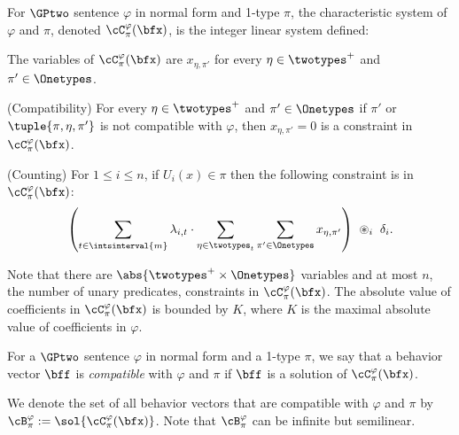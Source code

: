 \begin{definition}
\label{def:characteristic-system}
    For $\GPtwo$ sentence $\varphi$ in normal form and 1-type $\pi$,
    the characteristic system of $\varphi$ and $\pi$, denoted $\cC^\varphi_\pi(\bfx)$,
    is the integer linear system defined:
    \begin{compactitem}
        \item The variables of $\cC^\varphi_\pi(\bfx)$ are $x_{\eta, \pi'}$
        for every $\eta \in \twotypes^+$ and $\pi' \in \Onetypes$.
        \item (Compatibility)
        For every $\eta \in \twotypes^+$ and $\pi' \in \Onetypes$
        if $\pi'$ or $\tuple{\pi, \eta, \pi'}$ is not compatible with $\varphi$,
        then $x_{\eta, \pi'} = 0$
        is a constraint in $\cC^\varphi_\pi(\bfx)$.
        \item (Counting)
        For $1 \le i \le n$, if $U_i(x) \in \pi$
        then the following constraint is in $\cC^\varphi_\pi(\bfx)$:
        \begin{equation*}
            \left(
                \sum_{t \in \intsinterval{m}}
                \lambda_{i, t} \cdot
                \sum_{\eta \in \twotypes_t}
                \sum_{\pi' \in \Onetypes} 
                x_{\eta, \pi'}
            \right)
            \ \circledast_i\ \delta_i.
        \end{equation*}
    \end{compactitem}

\end{definition}
Note that there are $\abs{\twotypes^+ \times \Onetypes}$ variables
and at most $n$, the number of unary predicates, constraints in $\cC^\varphi_\pi(\bfx)$.
The absolute value of coefficients in $\cC^\varphi_\pi(\bfx)$
is bounded by $K$, where $K$ is the maximal absolute value of coefficients in $\varphi$.

\begin{definition}
    For a $\GPtwo$ sentence $\varphi$ in normal form 
    and a 1-type $\pi$,
    we say that a behavior vector $\bff$ is \emph{compatible} with $\varphi$ and $\pi$
    if $\bff$ is a solution of $\cC^\varphi_\pi(\bfx)$.
\end{definition}
We denote the set of all behavior vectors that are compatible with $\varphi$ and $\pi$
by $\cB^{\varphi}_{\pi} := \sol{\cC^\varphi_\pi(\bfx)}$.
Note that $\cB^{\varphi}_{\pi}$ can be infinite but semilinear.


